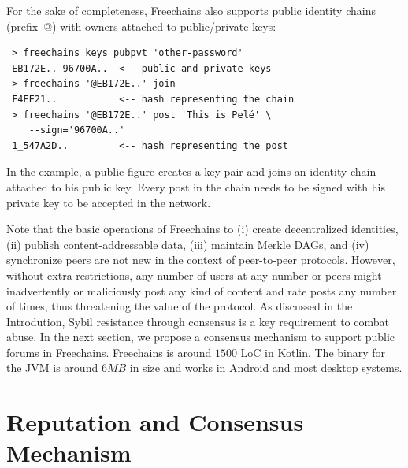 \documentclass[10pt,journal,compsoc]{IEEEtran}
\newcommand{\FC}       {Freechains\xspace}
\begin{document}
For the sake of completeness, \FC also supports public identity chains
(prefix~$@$) with owners attached to public/private keys:

{\footnotesize
\begin{verbatim}
 > freechains keys pubpvt 'other-password'
 EB172E.. 96700A..  <-- public and private keys
 > freechains '@EB172E..' join
 F4EE21..           <-- hash representing the chain
 > freechains '@EB172E..' post 'This is Pelé' \
    --sign='96700A..'
 1_547A2D..         <-- hash representing the post
\end{verbatim}
}

In the example, a public figure creates a key pair and joins an identity chain
attached to his public key.
Every post in the chain needs to be signed with his private key to be accepted
in the network.

Note that the basic operations of Freechains to (i) create decentralized
identities, (ii) publish content-addressable data, (iii) maintain Merkle DAGs,
and (iv) synchronize peers are not new in the context of peer-to-peer
protocols.
%
However, without extra restrictions, any number of users at any number or peers
might inadvertently or maliciously post any kind of content and rate posts any
number of times, thus threatening the value of the protocol.
%
As discussed in the Introdution, Sybil resistance through consensus is a key
requirement to combat abuse.
%
In the next section, we propose a consensus mechanism to support public forums
in \FC.
%
\FC is around $1500$ LoC in Kotlin. %
The binary for the JVM is around $6MB$ in size and works in Android and most
desktop systems.


\section{Reputation and Consensus Mechanism}
\label{sec.consensus}
\end{document}
